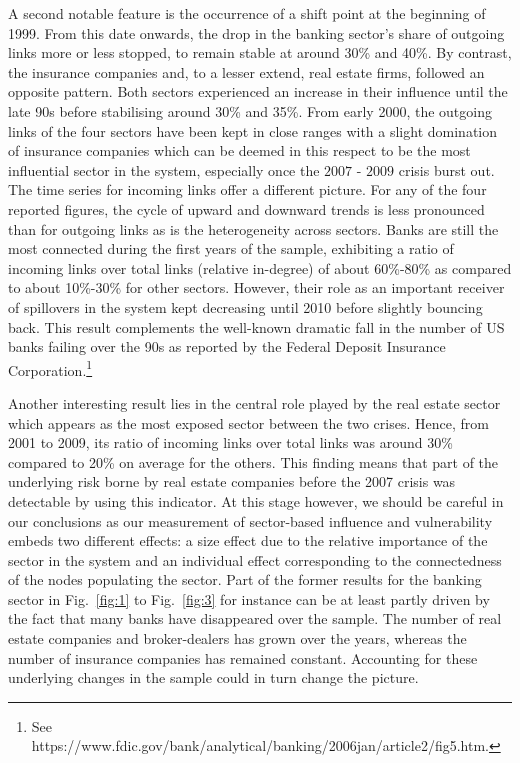 \documentclass[a4paper,10pt]{article}
\begin{document}
A second notable feature is the occurrence of a shift point at the beginning of 1999. From this date
onwards, the drop in the banking sector’s share of outgoing links more or less stopped, to remain stable at around  30\% and 
40\%. By contrast, the insurance companies and, to a lesser extend, real estate firms, followed an opposite pattern. Both
sectors experienced an increase in their influence until the late 90s before stabilising around  30\% and 35\%. From early 
2000, the outgoing links of the four sectors have been kept in close ranges with a slight domination of insurance companies 
which can be deemed in this respect to be the most influential sector in the system, especially once the $2007$ - $2009$ crisis
burst out. The time series for incoming links offer a different picture. For any of the four reported figures, the cycle of 
upward and downward trends is less pronounced than for outgoing links as is the heterogeneity across sectors. Banks are still 
the most connected during the first years of the sample, exhibiting a ratio of incoming links over total links 
(relative in-degree) of about 60\%-80\% as compared to about 10\%-30\% for other sectors. However, their role as an 
important receiver of spillovers in the system kept decreasing until 2010 before slightly bouncing back.  This result 
complements the well-known dramatic fall in the number of US banks failing over the 90s as reported by the Federal Deposit 
Insurance Corporation.\footnote{See https://www.fdic.gov/bank/analytical/banking/2006jan/article2/fig5.htm.} 

Another interesting result lies in the central role played by the real estate sector which appears as the most exposed sector
between the two crises. Hence, from 2001 to 2009, its ratio of incoming links over total links was around 30\% compared to 
20\% on average for the others. This finding means that part of the underlying risk borne by real estate companies before 
the 2007 crisis was detectable by using this indicator. At this stage however, we should be careful in our conclusions as
our measurement of sector-based influence and vulnerability embeds two different effects: a size effect due to the relative
importance of the sector in the system and an individual effect corresponding to the connectedness of the nodes populating 
the sector. Part of the former results for the banking sector in Fig.~\ref{fig:1} to Fig.~\ref{fig:3}  for instance can be 
at least partly driven by the fact that many banks have disappeared over the sample.  The number of real estate companies 
and broker-dealers has grown over the years, whereas the number of insurance companies has remained constant. Accounting for 
these underlying changes in the sample could in turn change the picture. 
 
\end{document}
